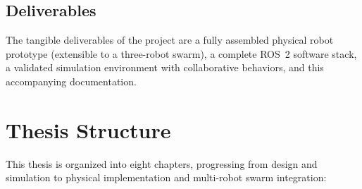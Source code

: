\subsection{Deliverables}
The tangible deliverables of the project are a fully assembled physical robot prototype (extensible to a three-robot swarm), a complete ROS~2 software stack, a validated simulation environment with collaborative behaviors, and this accompanying documentation.

\section{Thesis Structure}
\label{sec:thesis_structure}

This thesis is organized into eight chapters, progressing from design and simulation to physical implementation and multi-robot swarm integration:

